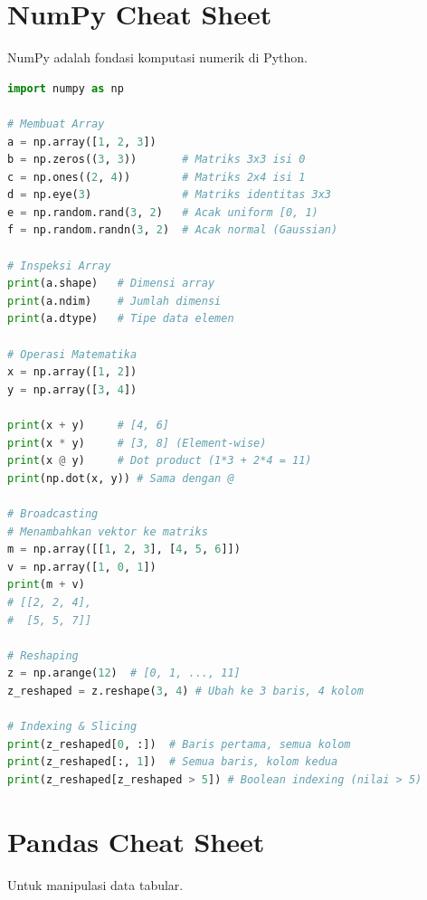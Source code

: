 \section{NumPy Cheat Sheet}
NumPy adalah fondasi komputasi numerik di Python.

\begin{lstlisting}[language=Python]
import numpy as np

# Membuat Array
a = np.array([1, 2, 3])
b = np.zeros((3, 3))       # Matriks 3x3 isi 0
c = np.ones((2, 4))        # Matriks 2x4 isi 1
d = np.eye(3)              # Matriks identitas 3x3
e = np.random.rand(3, 2)   # Acak uniform [0, 1)
f = np.random.randn(3, 2)  # Acak normal (Gaussian)

# Inspeksi Array
print(a.shape)   # Dimensi array
print(a.ndim)    # Jumlah dimensi
print(a.dtype)   # Tipe data elemen

# Operasi Matematika
x = np.array([1, 2])
y = np.array([3, 4])

print(x + y)     # [4, 6]
print(x * y)     # [3, 8] (Element-wise)
print(x @ y)     # Dot product (1*3 + 2*4 = 11)
print(np.dot(x, y)) # Sama dengan @

# Broadcasting
# Menambahkan vektor ke matriks
m = np.array([[1, 2, 3], [4, 5, 6]])
v = np.array([1, 0, 1])
print(m + v)
# [[2, 2, 4],
#  [5, 5, 7]]

# Reshaping
z = np.arange(12)  # [0, 1, ..., 11]
z_reshaped = z.reshape(3, 4) # Ubah ke 3 baris, 4 kolom

# Indexing & Slicing
print(z_reshaped[0, :])  # Baris pertama, semua kolom
print(z_reshaped[:, 1])  # Semua baris, kolom kedua
print(z_reshaped[z_reshaped > 5]) # Boolean indexing (nilai > 5)
\end{lstlisting}

\section{Pandas Cheat Sheet}
Untuk manipulasi data tabular.

